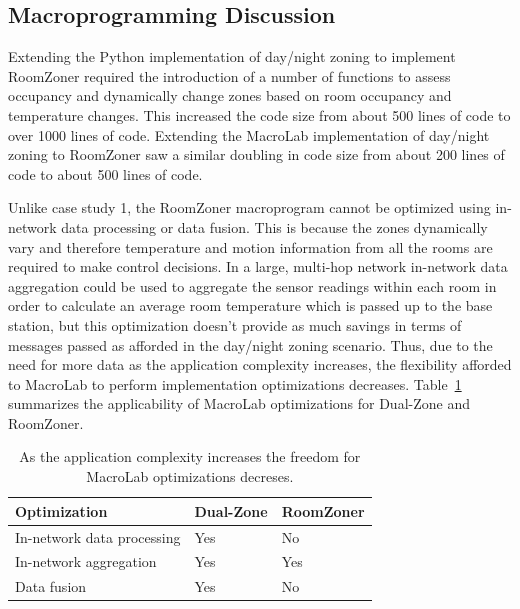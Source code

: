 \subsection{Macroprogramming Discussion}
Extending the Python implementation of day/night zoning to implement RoomZoner
required the introduction of a number of functions to assess occupancy and
dynamically change zones based on room occupancy and temperature changes. This
increased the code size from about 500 lines of code to over 1000 lines of
code. Extending the MacroLab implementation of day/night zoning to RoomZoner saw
a similar doubling in code size from about 200 lines of code to about 500 lines
of code.

Unlike case study 1, the RoomZoner macroprogram cannot be optimized using
in-network data processing or data fusion. This is because the zones dynamically
vary and therefore temperature and motion information from all the rooms are
required to make control decisions. In a large, multi-hop network in-network
data aggregation could be used to aggregate the sensor readings within each room
in order to calculate an average room temperature which is passed up to the base
station, but this optimization doesn't provide as much savings in terms of
messages passed as afforded in the day/night zoning scenario. Thus, due to the
need for more data as the application complexity increases, the flexibility
afforded to MacroLab to perform implementation optimizations
decreases. Table~\ref{table:macrolabOptimizations} summarizes the applicability
of MacroLab optimizations for Dual-Zone and RoomZoner.

\begin{table}[!htb]
  {
  \begin{tabular}{|l|l|l|} \hline
    Optimization & Dual-Zone & RoomZoner\\ \hline\hline
    In-network data processing & Yes & No \\
    In-network aggregation & Yes & Yes \\ \hline
    Data fusion & Yes & No \\ \hline
  \end{tabular}}
  \caption[MacroLab optimizations for case studies]{As the application
  complexity increases the freedom for MacroLab optimizations decreses.}
  \label{table:macrolabOptimizations}
\end{table}

